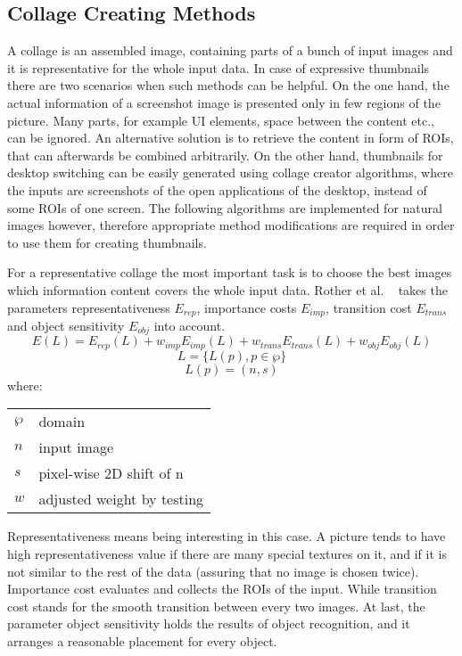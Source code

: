 \documentclass[draft,final]{vutinfth} %
\makeatletter
\newenvironment{conditions}
{\par\vspace{\abovedisplayskip}\noindent\begin{tabular}{>{$}l<{$} @{${}:{}$} l}}
	{\end{tabular}\par\vspace{\belowdisplayskip}}
\makeatother
\begin{document}
	\subsection{Collage Creating Methods} 
	A collage is an assembled image, containing parts of a bunch of input images and it is representative for the whole input data.
	In case of expressive thumbnails there are two scenarios when such methods can be helpful.
	On the one hand, the actual information of a screenshot image is presented only in few regions of the picture.
	Many parts, for example UI elements, space between the content etc., can be ignored. 
	An alternative solution is to retrieve the content in form of ROIs, that can afterwards be combined arbitrarily.
	On the other hand, thumbnails for desktop switching can be easily generated using collage creator algorithms, where the inputs are screenshots of the open applications of the desktop, instead of some ROIs of one screen.
	The following algorithms are implemented for natural images however, therefore appropriate method modifications are required in order to use them for creating thumbnails.\par
	For a representative collage the most important task is to choose the best images which information content covers the whole input data.
	Rother et al. ~\cite{rother2006autocollage} takes the parameters representativeness $E_{rep}$, importance costs  $E_{imp}$, transition cost  $E_{trans}$ and object sensitivity  $E_{obj}$ into account.
	\[ E(L)=E_{rep}(L)+w_{imp}E_{imp}(L)+w_{trans}E_{trans}(L)+w_{obj}E_{obj}(L) \]
	\[L = \{L(p), p \in \wp\}\]
	\[L(p) = (n, s)\]
	where:
	\begin{center}
		\begin{conditions}
			\wp & domain \\
			n & input image \\
			s & pixel-wise 2D shift of n \\
			w & adjusted weight by testing 
		\end{conditions}
	\end{center}
	Representativeness means being interesting in this case.
	A picture tends to have high representativeness value if there are many special textures on it, and if it is not similar to the rest of the data (assuring that no image is chosen twice).
	Importance cost evaluates and collects the ROIs of the input.
	While transition cost stands for the smooth transition between every two images.
	At last, the parameter object sensitivity holds the results of object recognition, and it arranges a reasonable placement for every object.\par
\end{document}
